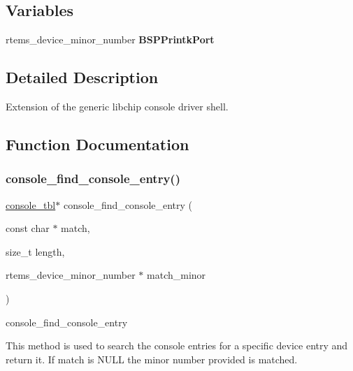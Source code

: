 \subsection*{Variables}
\begin{DoxyCompactItemize}
\item 
\mbox{\label{legacy-console_8h_a70125f66faffeac3295b05585611bcdf}} 
rtems\+\_\+device\+\_\+minor\+\_\+number {\bfseries B\+S\+P\+Printk\+Port}
\end{DoxyCompactItemize}


\subsection{Detailed Description}
Extension of the generic libchip console driver shell. 



\subsection{Function Documentation}
\mbox{\label{legacy-console_8h_a504c826507edc4631251f6e2ccbeac8b}} 
\subsubsection{\texorpdfstring{console\_find\_console\_entry()}{console\_find\_console\_entry()}}
{\footnotesize\ttfamily \mbox{\hyperlink{struct__console__tbl}{console\+\_\+tbl}}$\ast$ console\+\_\+find\+\_\+console\+\_\+entry (\begin{DoxyParamCaption}\item[{const char $\ast$}]{match,  }\item[{size\+\_\+t}]{length,  }\item[{rtems\+\_\+device\+\_\+minor\+\_\+number $\ast$}]{match\+\_\+minor }\end{DoxyParamCaption})}



console\+\_\+find\+\_\+console\+\_\+entry 

This method is used to search the console entries for a specific device entry and return it. If match is N\+U\+LL the minor number provided is matched. \mbox{\label{legacy-console_8h_a876e108a27082ad7b2a68f26dd37b673}} 
